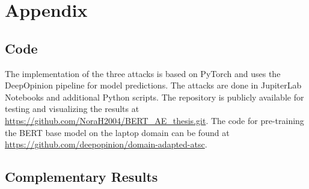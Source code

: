 
\renewcommand*{\thepage}{A\arabic{page}}

\section{Appendix}
\subsection{Code}
The implementation of the three attacks is based on PyTorch and uses the DeepOpinion pipeline for model predictions. The attacks are done in JupiterLab Notebooks and additional Python scripts. The repository is publicly available for testing and visualizing the results at \url{https://github.com/NoraH2004/BERT_AE_thesis.git}. The code for pre-training the BERT base model on the laptop domain can be found at \url{https://github.com/deepopinion/domain-adapted-atsc}.

\subsection{Complementary Results}

